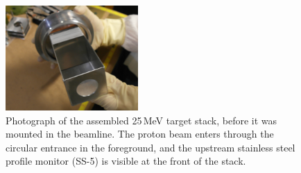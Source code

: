 \begin{figure}[ht]
 \centering
 \includegraphics[width=0.45\textwidth]{./figures/SAM_2494.JPG}
 \caption{\label{fig:fe_target_stack}Photograph of the assembled 25\,MeV target stack, before it was mounted in the beamline. The proton beam enters through the circular entrance in the foreground, and the upstream stainless steel profile monitor (SS-5) is visible at the front of the stack.}
\end{figure}

